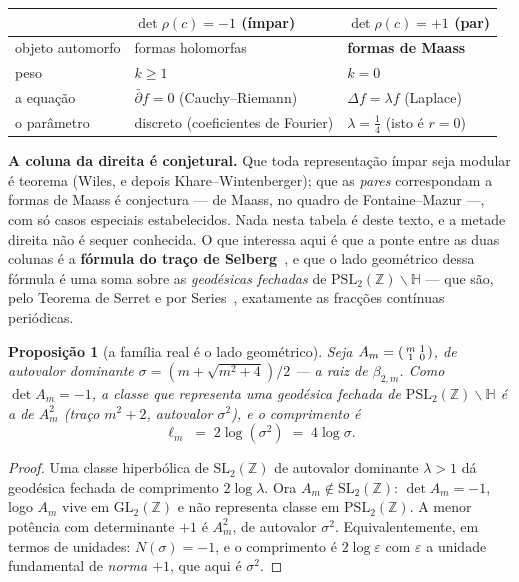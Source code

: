 \documentclass[11pt,a4paper]{article}
\theoremstyle{plain}
\newtheorem{proposicao}[teorema]{Proposição}
\theoremstyle{definition}
\theoremstyle{remark}
\newcommand{\Z}{\mathbb{Z}}
\newcommand{\GL}{\mathrm{GL}}
\newcommand{\PSL}{\mathrm{PSL}}
\newcommand{\SL}{\mathrm{SL}}
\newcommand{\Hyp}{\mathbb{H}}
\begin{document}
\begin{center}\small
\begin{tabular}{lll}
\hline
 & $\det\rho(c)=-1$ (ímpar) & $\det\rho(c)=+1$ (par) \\ \hline
objeto automorfo & formas holomorfas & \textbf{formas de Maass} \\
peso & $k\geq1$ & $k=0$ \\
a equação & $\bar\partial f = 0$ (Cauchy--Riemann) & $\Delta f = \lambda f$ (Laplace) \\
o parâmetro & discreto (coeficientes de Fourier) & $\lambda = \tfrac14$ (isto é $r=0$) \\
\hline
\end{tabular}
\end{center}

\noindent \textbf{A coluna da direita é conjetural.} Que toda representação ímpar seja modular é
teorema (Wiles, e depois Khare--Wintenberger); que as \emph{pares} correspondam a formas de Maass
é conjectura --- de Maass, no quadro de Fontaine--Mazur ---, com só casos especiais estabelecidos.
Nada nesta tabela é deste texto, e a metade direita não é sequer conhecida. O que interessa aqui é que a ponte entre as duas colunas é a
\textbf{fórmula do traço de Selberg}~\cite{selberg1956}, e que o lado geométrico dessa fórmula é
uma soma sobre as \emph{geodésicas fechadas} de $\PSL_2(\Z)\backslash\Hyp$ --- que são, pelo
Teorema de Serret e por Series~\cite{series1985}, exatamente as fracções contínuas periódicas.

\begin{proposicao}[a família real é o lado geométrico]\label{prop:selberg}
Seja $A_m=\begin{psmallmatrix}m&1\\1&0\end{psmallmatrix}$, de autovalor dominante
$\sigma = (m+\sqrt{m^2+4})/2$ --- a raiz de $\beta_{2,m}$. Como $\det A_m = -1$, a classe que
representa uma geodésica fechada de $\PSL_2(\Z)\backslash\Hyp$ é a de $A_m^2$ (traço $m^2+2$,
autovalor $\sigma^2$), e o comprimento é
\[
  \ell_m \;=\; 2\log(\sigma^2) \;=\; 4\log\sigma .
\]
\end{proposicao}

\begin{proof}
Uma classe hiperbólica de $\SL_2(\Z)$ de autovalor dominante $\lambda>1$ dá geodésica fechada de
comprimento $2\log\lambda$. Ora $A_m \notin \SL_2(\Z)$: $\det A_m = -1$, logo $A_m$ vive em
$\GL_2(\Z)$ e não representa classe em $\PSL_2(\Z)$. A menor potência com determinante $+1$ é
$A_m^2$, de autovalor $\sigma^2$. Equivalentemente, em termos de unidades: $N(\sigma) = -1$, e o
comprimento é $2\log\varepsilon$ com $\varepsilon$ a unidade fundamental de \emph{norma $+1$}, que
aqui é $\sigma^2$.
\end{proof}
\end{document}
